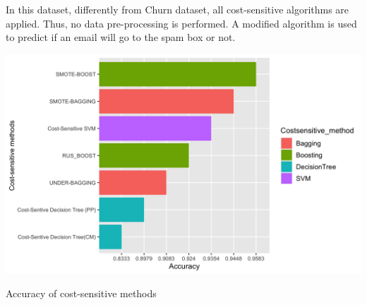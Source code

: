 In this dataset, differently from Churn dataset, all cost-sensitive algorithms are applied. Thus, no data pre-processing is performed. A modified algorithm is used to predict if an email will go to the spam box or not. \\

\begin{center}
\includegraphics[width=1.1\textwidth]{Tesi_GabrieleCola/img/spam5.png}
\caption{Accuracy of cost-sensitive methods}
\end{center}



    
    



